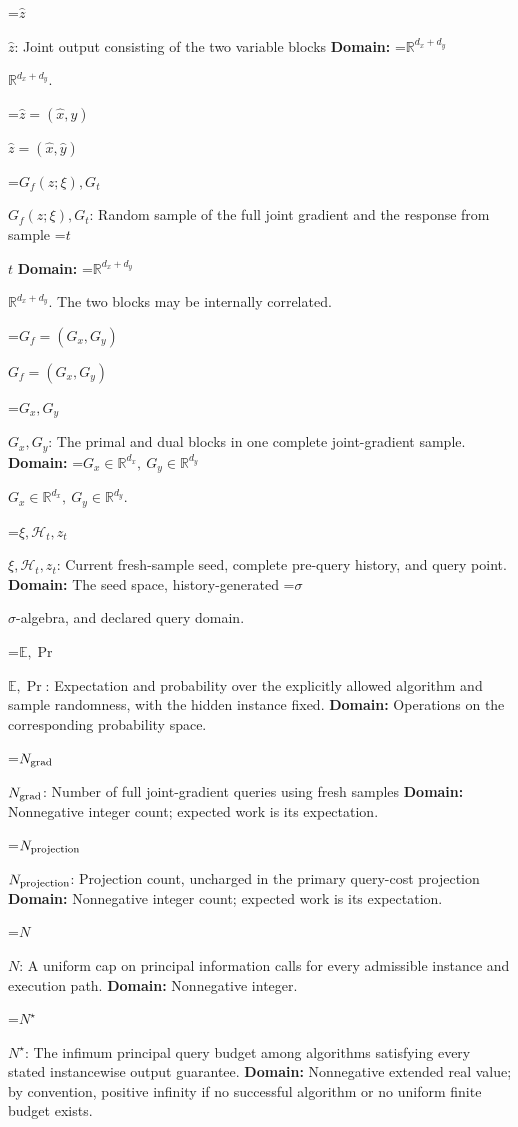 \documentclass[10pt,a4paper]{article}
\newcommand{\AtlasMath}[1]{\par\begingroup\centering\setbox0=\hbox{$\displaystyle #1$}\ifdim\wd0>1.4\linewidth\typeout{ATLAS WIDE FORMULA: \the\wd0}\fi\ifdim\wd0>\linewidth\resizebox{\linewidth}{!}{\box0}\else\box0\fi\par\endgroup}
\newcommand{\AtlasInlineMath}[1]{\begingroup\setbox0=\hbox{$#1$}\ifdim\wd0>.4\linewidth\endgroup\AtlasMath{#1}\else\endgroup$#1$\fi}
\begin{document}
\AtlasInlineMath{\widehat z}: Joint output consisting of the two variable blocks \textbf{Domain:} \AtlasInlineMath{\mathbb R^{d_x+d_y}}.



\AtlasInlineMath{\widehat z=(\widehat x,\widehat y)}



\AtlasInlineMath{G_f(z;\xi),G_t}: Random sample of the full joint gradient and the response from sample \AtlasInlineMath{t} \textbf{Domain:} \AtlasInlineMath{\mathbb R^{d_x+d_y}}. The two blocks may be internally correlated.



\AtlasInlineMath{G_f=(G_x,G_y)}



\AtlasInlineMath{G_x,G_y}: The primal and dual blocks in one complete joint-gradient sample. \textbf{Domain:} \AtlasInlineMath{G_x\in\mathbb R^{d_x},\ G_y\in\mathbb R^{d_y}}.



\AtlasInlineMath{\xi,\mathcal H_t,z_t}: Current fresh-sample seed, complete pre-query history, and query point. \textbf{Domain:} The seed space, history-generated \AtlasInlineMath{\sigma}-algebra, and declared query domain.



\AtlasInlineMath{\mathbb E,\Pr}: Expectation and probability over the explicitly allowed algorithm and sample randomness, with the hidden instance fixed. \textbf{Domain:} Operations on the corresponding probability space.



\AtlasInlineMath{N_{\rm grad}}: Number of full joint-gradient queries using fresh samples \textbf{Domain:} Nonnegative integer count; expected work is its expectation.



\AtlasInlineMath{N_{\rm projection}}: Projection count, uncharged in the primary query-cost projection \textbf{Domain:} Nonnegative integer count; expected work is its expectation.



\AtlasInlineMath{N}: A uniform cap on principal information calls for every admissible instance and execution path. \textbf{Domain:} Nonnegative integer.



\AtlasInlineMath{N^\star}: The infimum principal query budget among algorithms satisfying every stated instancewise output guarantee. \textbf{Domain:} Nonnegative extended real value; by convention, positive infinity if no successful algorithm or no uniform finite budget exists.
\end{document}
